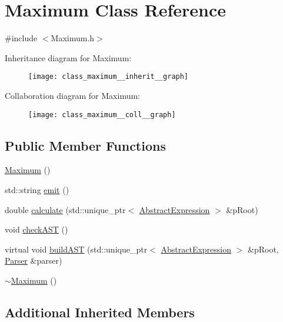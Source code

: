 \hypertarget{class_maximum}{}\section{Maximum Class Reference}
\label{class_maximum}


{\ttfamily \#include $<$Maximum.\+h$>$}



Inheritance diagram for Maximum\+:
\nopagebreak
\begin{figure}[H]
\begin{center}
\leavevmode
\texttt{[image: class\_maximum\_\_inherit\_\_graph]}
\end{center}
\end{figure}


Collaboration diagram for Maximum\+:
\nopagebreak
\begin{figure}[H]
\begin{center}
\leavevmode
\texttt{[image: class\_maximum\_\_coll\_\_graph]}
\end{center}
\end{figure}
\subsection*{Public Member Functions}
\begin{DoxyCompactItemize}
\item 
\mbox{\hyperlink{class_maximum_a41816ea834ba28accb734188572e2f5c}{Maximum}} ()
\item 
std\+::string \mbox{\hyperlink{class_maximum_ad1f010f3efa2b463a6ab53c8bfaccbb8}{emit}} ()
\item 
double \mbox{\hyperlink{class_maximum_ab10a5344f64954905d17d72f4573f805}{calculate}} (std\+::unique\+\_\+ptr$<$ \mbox{\hyperlink{class_abstract_expression}{Abstract\+Expression}} $>$ \&p\+Root)
\item 
void \mbox{\hyperlink{class_maximum_a2a37f1b30773d9c63ab57941f5e89cbe}{check\+A\+ST}} ()
\item 
virtual void \mbox{\hyperlink{class_maximum_a55e8a52bc27e2cf0e1d99ca246ff7189}{build\+A\+ST}} (std\+::unique\+\_\+ptr$<$ \mbox{\hyperlink{class_abstract_expression}{Abstract\+Expression}} $>$ \&p\+Root, \mbox{\hyperlink{class_parser}{Parser}} \&parser)
\item 
\mbox{\hyperlink{class_maximum_aa68d9d5f596472b1cb0604399ab599c0}{$\sim$\+Maximum}} ()
\end{DoxyCompactItemize}
\subsection*{Additional Inherited Members}


